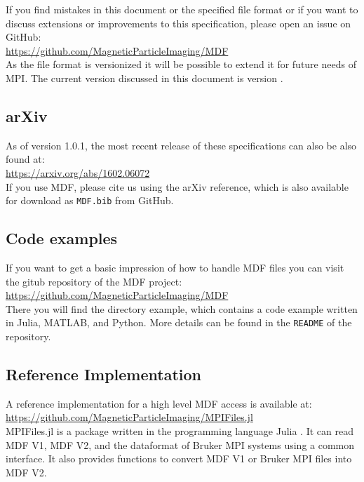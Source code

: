 \documentclass[landscape,a4paper]{article} %
\newcommand{\inlvar}[1]{{\ttfamily#1}}
\begin{document}
\begin{multicols}{2}
If you find mistakes in this document or the specified file format or if you want to discuss extensions or improvements to this specification, please open an issue on GitHub:\\
\hspace*{1cm}\url{https://github.com/MagneticParticleImaging/MDF}\\
As the file format is versionized it will be possible to extend it for future needs of MPI. The current version discussed in this document is version \version.

\subsection{arXiv}
As of version 1.0.1, the most recent release of these specifications can also be also found at:\\
\hspace*{1cm}\url{https://arxiv.org/abs/1602.06072}\\
If you use MDF, please cite us using the arXiv reference, which is also available for download as \texttt{MDF.bib} from GitHub.


\subsection{Code examples}		 
  		  
If you want to get a basic impression of how to handle MDF files you can visit the gitub repository of the MDF project:\\		
  \hspace*{1cm}\url{https://github.com/MagneticParticleImaging/MDF}\\	
There you will find the directory example, which contains a code example written in Julia, MATLAB, and Python. More details can be found in the \texttt{README} of the repository.
 
\subsection{Reference Implementation}		 

A reference implementation for a high level MDF access is available at:\\
  \hspace*{1cm}\url{https://github.com/MagneticParticleImaging/MPIFiles.jl}\\	
\inlvar{MPIFiles.jl} is a package written in the programming language Julia \cite{Bezanson2012,Bezanson2014,Bezanson2014a}. It can read MDF V1, MDF V2, and the dataformat of Bruker MPI systems using a common interface. It also provides functions to convert MDF V1 or Bruker MPI files into MDF V2.

\end{multicols}
\end{document}
